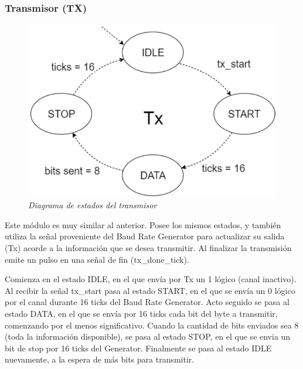 \documentclass[12pt,A4paper,titlepage]{article}
\begin{document}
\subsubsection{Transmisor (TX)}
\begin{figure}[H] 
	\centering
	\includegraphics[scale=0.6]{figure/estados_TX.png}
	\caption{\textit{Diagrama de estados del transmisor}}
\end{figure}
Este módulo es muy similar al anterior. Posee los mismos estados, y también utiliza la señal proveniente del Baud Rate Generator para actualizar su salida (Tx) acorde a la información que se desea transmitir. Al finalizar la transmisión emite un pulso en una señal de fin (tx\_done\_tick).

Comienza en el estado IDLE, en el que envía por Tx un 1 lógico (canal inactivo). Al recibir la señal tx\_start pasa al estado START, en el que se envía un 0 lógico por el canal durante 16 ticks del Baud Rate Generator. Acto seguido se pasa al estado DATA, en el que se envía por 16 ticks cada bit del byte a transmitir, comenzando por el menos significativo. Cuando la cantidad de bits enviados sea 8 (toda la información disponible), se pasa al estado STOP, en el que se envia un bit de stop por 16 ticks del Generator. Finalmente se pasa al estado IDLE nuevamente, a la espera de más bits para transmitir.
\end{document}
